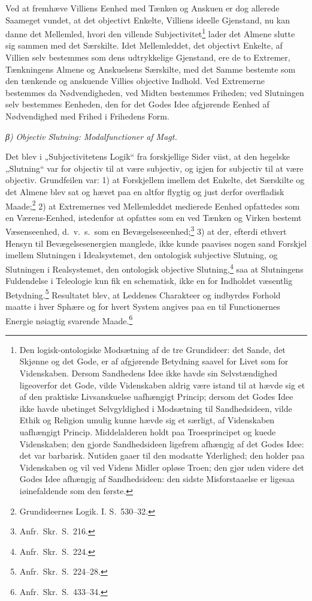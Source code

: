 \documentclass[12pt]{book}
\newcommand{\opage}[1]{\marginnote{\footnotesize\textit{[#1]}}}
\begin{document}
Ved at fremhæve Villiens Eenhed med Tænken og Anskuen er dog allerede Saameget vundet, at det objectivt Enkelte, Villiens ideelle Gjenstand, nu kan danne det Mellemled, hvori den villende Subjectivitet\footnote{Den logisk-ontologiske Modsætning af de tre Grundideer: det Sande, det Skjønne og det Gode, er af afgjørende Betydning saavel for Livet som for Videnskaben. Dersom Sandhedens Idee ikke havde sin Selvstændighed ligeoverfor det Gode, vilde Videnskaben aldrig være istand til at hævde sig et af den praktiske Livsanskuelse uafhængigt Princip; dersom det Godes Idee ikke havde ubetinget Selvgyldighed i Modsætning til Sandhedsideen, vilde Ethik og Religion umulig kunne hævde sig et særligt, af Videnskaben uafhængigt Princip. Middelalderen holdt paa Troesprincipet og kuede Videnskaben; den gjorde Sandhedsideen ligefrem afhængig af det Godes Idee: det var barbarisk. Nutiden gaaer til den modsatte Yderlighed; den holder paa Videnskaben og vil ved Videns Midler opløse Troen; den gjør uden videre det Godes Idee afhængig af Sandhedsideen: den sidste Misforstaaelse er ligesaa iøinefaldende som den første.}%
 lader det Almene slutte sig sammen med det Særskilte. Idet Mellemleddet, det objectivt Enkelte, af Villien selv bestemmes som dens udtrykkelige Gjenstand, ere de to Extremer, Tænkningens Almene og Anskuelsens Særskilte, med det Samme bestemte som den tænkende og anskuende Villies objective Indhold. Ved Extremerne bestemmes da Nødvendigheden, ved Midten bestemmes Friheden; ved Slutningen selv bestemmes Eenheden, den for det Godes
\opage{384}Idee afgjørende Eenhed af Nødvendighed med Frihed i Frihedens Form.

\medskip
\noindent\textit{β)} \emph{Objectiv Slutning: Modalfunctioner af Magt.}
\medskip

Det blev i „Subjectivitetens Logik“ fra forskjellige Sider viist, at den hegelske „Slutning“ var for objectiv til at være subjectiv, og igjen for subjectiv til at være objectiv. Grundfeilen var: 1) at Forskjellem imellem det Enkelte, det Særskilte og det Almene blev sat og hævet paa en altfor flygtig og just derfor overfladisk Maade;\footnote{Grundideernes Logik. I. S.~530--32.}%
2) at Extremernes ved Mellemleddet medierede Eenhed opfattedes som en Værens-Eenhed, istedenfor at opfattes som en ved Tænken og Virken bestemt Væsenseenhed, d.\ v.\ s.\ som en Bevægelseseenhed;\footnote{Anfr.\ Skr.\ S.~216.}%
 3) at der, efterdi ethvert Hensyn til Bevægelsesenergien manglede, ikke kunde paavises nogen sand Forskjel imellem Slutningen i Idealsystemet, den ontologisk subjective Slutning, og Slutningen i Realsystemet, den ontologisk objective Slutning,\footnote{Anfr.\ Skr.\ S.~224.}%
 saa at Slutningens Fuldendelse i Teleologie kun fik en schematisk, ikke en for Indholdet væsentlig Betydning.\footnote{Anfr.\ Skr.\ S.~224--28.}%
 Resultatet blev, at Leddenes Charakteer og indbyrdes Forhold maatte i hver Sphære og for hvert System angives paa en til Functionernes Energie nøiagtig svarende Maade.\footnote{Anfr.\ Skr.\ S.~433--34.}%
\end{document}
